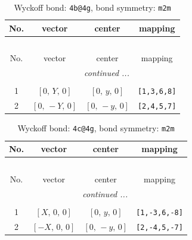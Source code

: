 \documentclass[fleqn,8pt]{jsarticle}
\begin{document}
\renewcommand{\arraystretch}{1.2}
\begin{longtable}{cccc}
\caption{Wyckoff bond: {\tt 4b@4g}, bond symmetry: {\tt m2m}}
 \\
 \hline \hline
No. & vector & center & mapping \\ \hline \endfirsthead

\multicolumn{3}{l}{\tablename\ \thetable{}} \\
 \hline \hline
No. & vector & center & mapping \\ \hline \endhead

 \hline \hline
\multicolumn{3}{r}{\footnotesize\it continued ...} \\ \endfoot

 \hline \hline
\multicolumn{3}{r}{} \\ \endlastfoot

1 & $\left[ 0,\, Y,\, 0 \right]$ & $\left[ 0,\, y,\, 0 \right]$ & {\tt [1,3,6,8]} \\ \hline
2 & $\left[ 0,\, - Y,\, 0 \right]$ & $\left[ 0,\, - y,\, 0 \right]$ & {\tt [2,4,5,7]} \\
\end{longtable}
\renewcommand{\arraystretch}{1.2}
\begin{longtable}{cccc}
\caption{Wyckoff bond: {\tt 4c@4g}, bond symmetry: {\tt m2m}}
 \\
 \hline \hline
No. & vector & center & mapping \\ \hline \endfirsthead

\multicolumn{3}{l}{\tablename\ \thetable{}} \\
 \hline \hline
No. & vector & center & mapping \\ \hline \endhead

 \hline \hline
\multicolumn{3}{r}{\footnotesize\it continued ...} \\ \endfoot

 \hline \hline
\multicolumn{3}{r}{} \\ \endlastfoot

1 & $\left[ X,\, 0,\, 0 \right]$ & $\left[ 0,\, y,\, 0 \right]$ & {\tt [1,-3,6,-8]} \\ \hline
2 & $\left[ - X,\, 0,\, 0 \right]$ & $\left[ 0,\, - y,\, 0 \right]$ & {\tt [2,-4,5,-7]} \\
\end{longtable}
\renewcommand{\arraystretch}{1.2}
\end{document}
